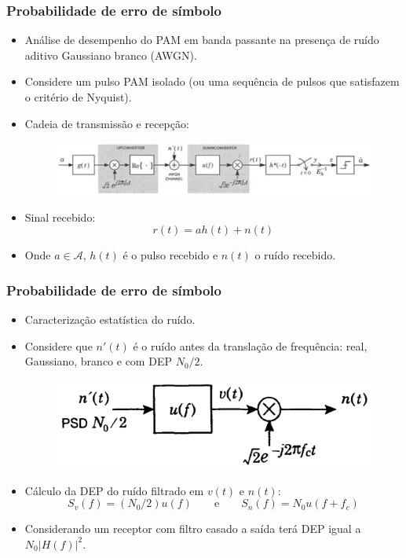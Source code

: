 \begin{frame}
	\frametitle{Probabilidade de erro de símbolo}

	\begin{itemize}
	    \item Análise de desempenho do PAM em banda passante na presença de ruído aditivo Gaussiano branco (AWGN).
	    \item Considere um pulso PAM isolado (ou uma sequência de pulsos que satisfazem o critério de Nyquist).
	    \item Cadeia de transmissão e recepção:
	    \begin{figure}[t]	
	      \begin{center}
		\includegraphics[width=0.85\columnwidth]{figs/pam_41}
	      \end{center}
	    \end{figure}
	    \item Sinal recebido:
	    \begin{equation*}
		  r(t) = ah(t) + n(t)
	    \end{equation*}
	    \item Onde $a\in \mathcal{A}$, $h(t)$ é o pulso recebido e $n(t)$ o ruído recebido.
	\end{itemize}	
\end{frame}

\begin{frame}
	\frametitle{Probabilidade de erro de símbolo}

	\begin{itemize}
	    \item Caracterização estatística do ruído.
	    \item Considere que $n'(t)$ é o ruído antes da translação de frequência: real, Gaussiano, branco e com DEP $N_0/2$.
	    \begin{figure}[t]	
	      \begin{center}
		\includegraphics[width=0.45\columnwidth]{figs/pam_42}
	      \end{center}
	    \end{figure}
	    \item Cálculo da DEP do ruído filtrado em $v(t)$ e $n(t)$:
	    \begin{equation*}
		S_v(f) = (N_0/2)u(f) \qquad \text{e} \qquad S_n(f) = N_0u(f+f_c)
	    \end{equation*}
	    \item Considerando um receptor com filtro casado a saída terá DEP igual a $N_0 |H(f)|^2$.
	\end{itemize}	
\end{frame}


